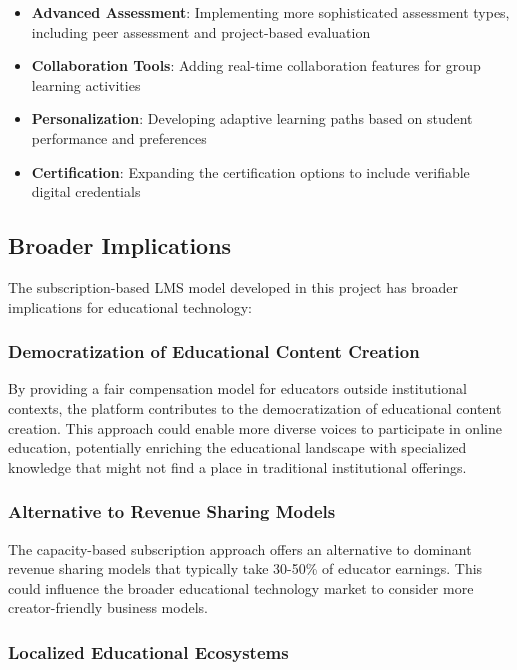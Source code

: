\begin{itemize}
    \item \textbf{Advanced Assessment}: Implementing more sophisticated assessment types, including peer assessment and project-based evaluation
    
    \item \textbf{Collaboration Tools}: Adding real-time collaboration features for group learning activities
    
    \item \textbf{Personalization}: Developing adaptive learning paths based on student performance and preferences
    
    \item \textbf{Certification}: Expanding the certification options to include verifiable digital credentials
\end{itemize}

\subsection{Broader Implications}

The subscription-based LMS model developed in this project has broader implications for educational technology:

\subsubsection{Democratization of Educational Content Creation}

By providing a fair compensation model for educators outside institutional contexts, the platform contributes to the democratization of educational content creation. This approach could enable more diverse voices to participate in online education, potentially enriching the educational landscape with specialized knowledge that might not find a place in traditional institutional offerings.

\subsubsection{Alternative to Revenue Sharing Models}

The capacity-based subscription approach offers an alternative to dominant revenue sharing models that typically take 30-50\% of educator earnings. This could influence the broader educational technology market to consider more creator-friendly business models.

\subsubsection{Localized Educational Ecosystems}


